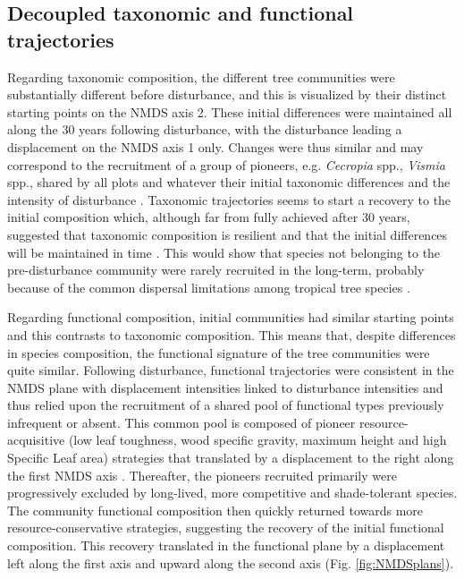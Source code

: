 \documentclass[fleqn,10pt]{ArtEcoFoG} %
\begin{document}
\subsection{Decoupled taxonomic and functional
trajectories}\label{decoupled-taxonomic-and-functional-trajectories}

Regarding taxonomic composition, the different tree communities were
substantially different before disturbance, and this is visualized by
their distinct starting points on the NMDS axis 2. These initial
differences were maintained all along the 30 years following
disturbance, with the disturbance leading a displacement on the NMDS
axis 1 only. Changes were thus similar and may correspond to the
recruitment of a group of pioneers, e.g. \emph{Cecropia} spp.,
\emph{Vismia} spp., shared by all plots and whatever their initial
taxonomic differences and the intensity of disturbance
\citep{Denslow2000, Bongers2009}. Taxonomic trajectories seems to start
a recovery to the initial composition which, although far from fully
achieved after 30 years, suggested that taxonomic composition is
resilient and that the initial differences will be maintained in time
\citep{Folke2006}. This would show that species not belonging to the
pre-disturbance community were rarely recruited in the long-term,
probably because of the common dispersal limitations among tropical tree
species \citep{Svenning2005}.

Regarding functional composition, initial communities had similar
starting points and this contrasts to taxonomic composition. This means
that, despite differences in species composition, the functional
signature of the tree communities were quite similar. Following
disturbance, functional trajectories were consistent in the NMDS plane
with displacement intensities linked to disturbance intensities and thus
relied upon the recruitment of a shared pool of functional types
previously infrequent or absent. This common pool is composed of pioneer
resource-acquisitive (low leaf toughness, wood specific gravity, maximum
height and high Specific Leaf area) strategies that translated by a
displacement to the right along the first NMDS axis
\citep{Westoby1998, Wright2004, Reich2014}. Thereafter, the pioneers
recruited primarily were progressively excluded by long-lived, more
competitive and shade-tolerant species. The community functional
composition then quickly returned towards more resource-conservative
strategies, suggesting the recovery of the initial functional
composition. This recovery translated in the functional plane by a
displacement left along the first axis and upward along the second axis
(Fig. \ref{fig:NMDSplans}).
\end{document}
